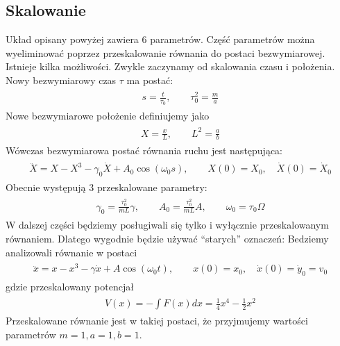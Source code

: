 \documentclass[a4paper,12pt,polish]{sphinxmanual}
\begin{document}
\subsection{Skalowanie}
\label{ch2/chII011:skalowanie}
Układ opisany powyżej zawiera 6 parametrów. Część parametrów można wyeliminować poprzez przeskalowanie równania do postaci bezwymiarowej. Istnieje kilka  możliwości. Zwykle zaczynamy od skalowania czasu i położenia. Nowy bezwymiarowy czas $\tau$ ma postać:
\label{ch2/chII011:equation-eqn3}\begin{gather}
\begin{split}s = \frac{t}{\tau_0}, \qquad \tau_0^2 = \frac{m}{a}\end{split}\label{ch2/chII011-eqn3}
\end{gather}
Nowe bezwymiarowe położenie definiujemy jako
\label{ch2/chII011:equation-eqn4}\begin{gather}
\begin{split}X = \frac{x}{L}, \qquad L^2 = \frac{a}{b}\end{split}\label{ch2/chII011-eqn4}
\end{gather}
Wówczas bezwymiarowa postać równania ruchu jest następująca:
\label{ch2/chII011:equation-eqn5}\begin{gather}
\begin{split}\ddot X = X - X^3 - \gamma_0 \dot X + A_0 \cos(\omega_0 s), \qquad X(0) = X_0, \quad  \dot X(0) = \dot X_0\end{split}\label{ch2/chII011-eqn5}
\end{gather}
Obecnie występują 3 przeskalowane parametry:
\label{ch2/chII011:equation-eqn6}\begin{gather}
\begin{split} \gamma_0  = \frac{\tau_0^2}{m L} \gamma, \qquad A_0 = \frac{\tau_0^2}{m L} A, \qquad \omega_0 = \tau_0 \Omega\end{split}\label{ch2/chII011-eqn6}
\end{gather}
W dalszej części będziemy posługiwali się tylko i wyłącznie przeskalowanym równaniem. Dlatego wygodnie będzie używać ``starych'' oznaczeń: Bedziemy analizowali równanie w postaci
\label{ch2/chII011:equation-eqn7}\begin{gather}
\begin{split}\ddot x = x - x^3 - \gamma \dot x + A \cos(\omega_0 t ), \qquad x(0) = x_0, \quad  \dot x(0) = \dot y_0 = v_0\end{split}\label{ch2/chII011-eqn7}
\end{gather}
gdzie przeskalowany potencjał
\label{ch2/chII011:equation-eqn7a}\begin{gather}
\begin{split}V(x) = - \int F(x) dx = \frac{1}{4} x^4 - \frac{1}{2} x^2\end{split}\label{ch2/chII011-eqn7a}
\end{gather}
Przeskalowane równanie jest w takiej postaci, że przyjmujemy wartości parametrów $m=1,  a=1,  b=1$.
\end{document}
